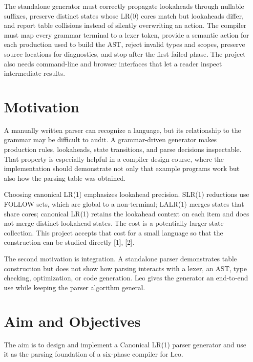 \documentclass[12pt,a4paper,oneside]{report}
\begin{document}
The standalone generator must correctly propagate lookaheads through nullable suffixes, preserve distinct states whose LR(0) cores match but lookaheads differ, and report table collisions instead of silently overwriting an action. The compiler must map every grammar terminal to a lexer token, provide a semantic action for each production used to build the AST, reject invalid types and scopes, preserve source locations for diagnostics, and stop after the first failed phase. The project also needs command-line and browser interfaces that let a reader inspect intermediate results.

\section{Motivation}
A manually written parser can recognize a language, but its relationship to the grammar may be difficult to audit. A grammar-driven generator makes production rules, lookaheads, state transitions, and parse decisions inspectable. That property is especially helpful in a compiler-design course, where the implementation should demonstrate not only that example programs work but also how the parsing table was obtained.

Choosing canonical LR(1) emphasizes lookahead precision. SLR(1) reductions use FOLLOW sets, which are global to a non-terminal; LALR(1) merges states that share cores; canonical LR(1) retains the lookahead context on each item and does not merge distinct lookahead states. The cost is a potentially larger state collection. This project accepts that cost for a small language so that the construction can be studied directly [1], [2].

The second motivation is integration. A standalone parser demonstrates table construction but does not show how parsing interacts with a lexer, an AST, type checking, optimization, or code generation. Leo gives the generator an end-to-end use while keeping the parser algorithm general.

\section{Aim and Objectives}
The aim is to design and implement a Canonical LR(1) parser generator and use it as the parsing foundation of a six-phase compiler for Leo.
\end{document}
